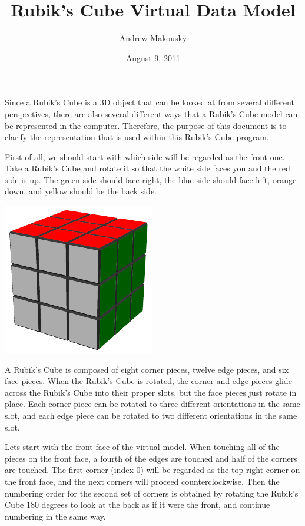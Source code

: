 \documentclass{article}
\begin{document}
\title{Rubik's Cube Virtual Data Model}
\author{Andrew Makousky}
\date{August 9, 2011}
\maketitle

Since a Rubik's Cube is a 3D object that can be looked at from several
different perspectives, there are also several different ways that a
Rubik's Cube model can be represented in the computer. Therefore, the
purpose of this document is to clarify the representation that is used
within this Rubik's Cube program.

First of all, we should start with which side will be regarded as the
front one. Take a Rubik's Cube and rotate it so that the white side
faces you and the red side is up. The green side should face right,
the blue side should face left, orange down, and yellow should be the
back side.

\begin{center}
\includegraphics{image1}
\end{center}

A Rubik's Cube is composed of eight corner pieces, twelve edge pieces,
and six face pieces. When the Rubik's Cube is rotated, the corner and
edge pieces glide across the Rubik's Cube into their proper slots, but
the face pieces just rotate in place. Each corner piece can be rotated
to three different orientations in the same slot, and each edge piece
can be rotated to two different orientations in the same slot.

Lets start with the front face of the virtual model. When touching all
of the pieces on the front face, a fourth of the edges are touched and
half of the corners are touched. The first corner (index 0) will be
regarded as the top-right corner on the front face, and the next
corners will proceed counterclockwise. Then the numbering order for
the second set of corners is obtained by rotating the Rubik's Cube 180
degrees to look at the back as if it were the front, and continue
numbering in the same way.
\end{document}
